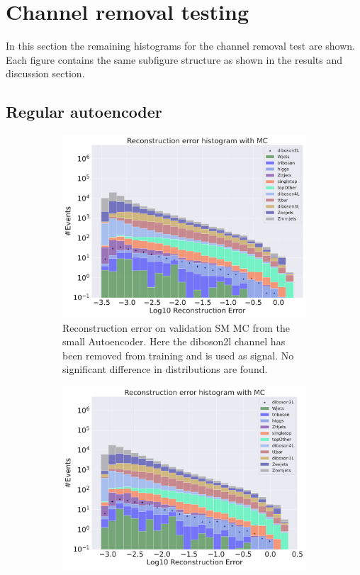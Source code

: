 \section{Channel removal testing}
In this section the remaining histograms for the channel removal test are shown. Each figure contains the 
same subfigure structure as shown in the results and discussion section. 
\subsection*{Regular autoencoder}

\begin{figure}[H]
    \centering
    \begin{subfigure}{.45\textwidth}
        \includegraphics[width=\textwidth]{Figures/AE_testing/small/b_data_recon_big_rm3_feats_sig_diboson2l.pdf}
        \caption{Reconstruction error on validation SM MC from the small Autoencoder. Here the diboson2l channel has been removed from training and 
        is used as signal. No significant difference in distributions are found.}
        \label{fig:ae_small_diboson2l}
    \end{subfigure}
    \hfill 
    \begin{subfigure}{.45\textwidth}
        \includegraphics[width=\textwidth]{Figures/AE_testing/big/b_data_recon_big_rm3_feats_sig_diboson2l.pdf}

\end{subfigure}
\end{figure}
